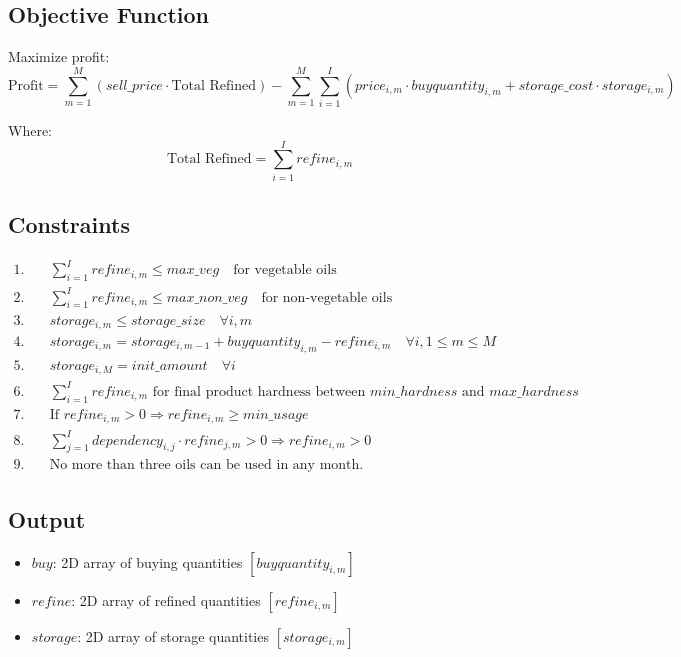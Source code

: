 \documentclass{article}
\begin{document}
\subsection*{Objective Function}
Maximize profit:
\[
\text{Profit} = \sum_{m=1}^{M} (sell\_price \cdot \text{Total Refined}) - \sum_{m=1}^{M} \sum_{i=1}^{I} (price_{i,m} \cdot buyquantity_{i,m} + storage\_cost \cdot storage_{i,m})
\]

Where:
\[
\text{Total Refined} = \sum_{i=1}^{I} refine_{i,m}
\]

\subsection*{Constraints}
\begin{align*}
1. & \quad \sum_{i=1}^{I} refine_{i,m} \leq max\_veg \quad \text{for vegetable oils}\\
2. & \quad \sum_{i=1}^{I} refine_{i,m} \leq max\_non\_veg \quad \text{for non-vegetable oils}\\
3. & \quad storage_{i,m} \leq storage\_size \quad \forall i, m\\
4. & \quad storage_{i,m} = storage_{i,m-1} + buyquantity_{i,m} - refine_{i,m} \quad \forall i, 1 \leq m \leq M\\
5. & \quad storage_{i,M} = init\_amount \quad \forall i\\
6. & \quad \sum_{i=1}^{I} refine_{i,m} \text{ for final product hardness between } min\_hardness \text{ and } max\_hardness\\
7. & \quad \text{If } refine_{i,m} > 0 \Rightarrow refine_{i,m} \geq min\_usage\\
8. & \quad \sum_{j=1}^{I} dependency_{i,j} \cdot refine_{j,m} > 0 \Rightarrow refine_{i,m} > 0\\
9. & \quad \text{No more than three oils can be used in any month.}
\end{align*}

\subsection*{Output}
\begin{itemize}
    \item $buy$: 2D array of buying quantities $\left[ buyquantity_{i,m} \right]$
    \item $refine$: 2D array of refined quantities $\left[ refine_{i,m} \right]$
    \item $storage$: 2D array of storage quantities $\left[ storage_{i,m} \right]$
\end{itemize}
\end{document}
